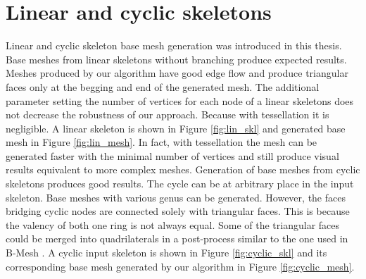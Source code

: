 \section{Linear and cyclic skeletons}

Linear and cyclic skeleton base mesh generation was introduced in this thesis.
Base meshes from linear skeletons without branching produce expected results.
Meshes produced by our algorithm have good edge flow and produce triangular faces only at the begging and end of the generated mesh.
The additional parameter setting the number of vertices for each node of a linear skeletons does not decrease the robustness of our approach.
Because with tessellation it is negligible.
A linear skeleton is shown in Figure \ref{fig:lin_skl} and generated base mesh in Figure \ref{fig:lin_mesh}.
In fact, with tessellation the mesh can be generated faster with the minimal number of vertices and still produce visual results equivalent to more complex meshes.
Generation of base meshes from cyclic skeletons produces good results.
The cycle can be at arbitrary place in the input skeleton.
Base meshes with various genus can be generated.
However, the faces bridging cyclic nodes are connected solely with triangular faces.
This is because the valency of both one ring is not always equal.
Some of the triangular faces could be merged into quadrilaterals in a post-process similar to the one used in B-Mesh \cite{ji_bm}.
A cyclic input skeleton is shown in Figure \ref{fig:cyclic_skl} and its corresponding base mesh generated by our algorithm in Figure \ref{fig:cyclic_mesh}.

